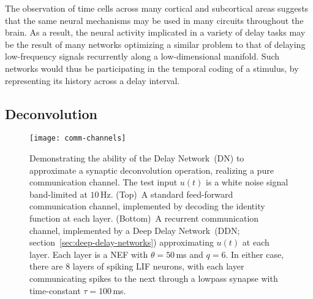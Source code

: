 The observation of time cells across many cortical and subcortical areas suggests that the same neural mechanisms may be used in many circuits throughout the brain.
As a result, the neural activity implicated in a variety of delay tasks may be the result of many networks optimizing a similar problem to that of delaying low-frequency signals recurrently along a low-dimensional manifold.
Such networks would thus be participating in the temporal coding of a stimulus, by representing its history across a delay interval.

\subsection{Deconvolution}
\label{sec:deconvolution}

\begin{figure}
    \centering
    \texttt{[image: comm-channels]}
     
    \caption{\label{fig:comm-channels} 
      Demonstrating the ability of the Delay Network~(DN) to approximate a synaptic deconvolution operation, realizing a pure communication channel.
      The test input $u(t)$ is a white noise signal band-limited at $10$\,Hz.
      (Top)~A standard feed-forward communication channel, implemented by decoding the identity function at each layer.
      (Bottom)~A recurrent communication channel, implemented by a Deep Delay Network~(DDN; section~\ref{sec:deep-delay-networks}) approximating $u(t)$ at each layer. Each layer is a NEF with $\theta = 50$\,ms and $q = 6$.
      In either case, there are $8$ layers of  spiking LIF neurons, with each layer communicating spikes to the next through a lowpass synapse with time-constant $\tau = 100$\,ms.
    }
\end{figure}



